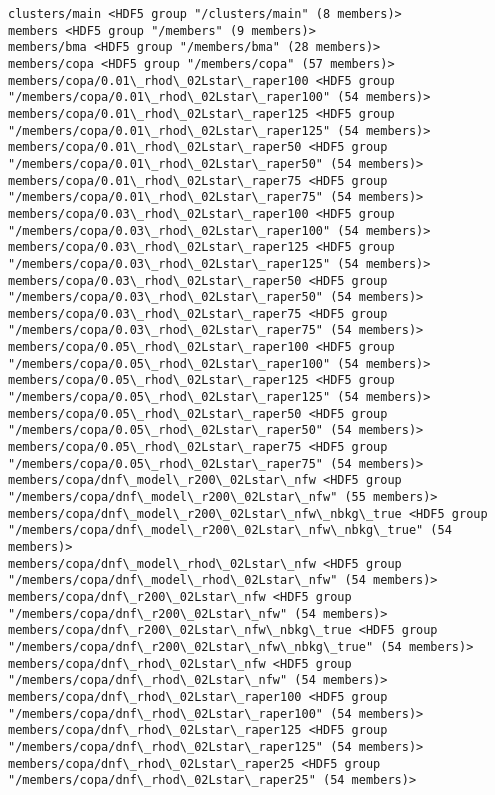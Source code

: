 \documentclass[11pt]{article}
\begin{document}
\begin{Verbatim}[commandchars=\\\{\}]
clusters/main <HDF5 group "/clusters/main" (8 members)>
members <HDF5 group "/members" (9 members)>
members/bma <HDF5 group "/members/bma" (28 members)>
members/copa <HDF5 group "/members/copa" (57 members)>
members/copa/0.01\_rhod\_02Lstar\_raper100 <HDF5 group "/members/copa/0.01\_rhod\_02Lstar\_raper100" (54 members)>
members/copa/0.01\_rhod\_02Lstar\_raper125 <HDF5 group "/members/copa/0.01\_rhod\_02Lstar\_raper125" (54 members)>
members/copa/0.01\_rhod\_02Lstar\_raper50 <HDF5 group "/members/copa/0.01\_rhod\_02Lstar\_raper50" (54 members)>
members/copa/0.01\_rhod\_02Lstar\_raper75 <HDF5 group "/members/copa/0.01\_rhod\_02Lstar\_raper75" (54 members)>
members/copa/0.03\_rhod\_02Lstar\_raper100 <HDF5 group "/members/copa/0.03\_rhod\_02Lstar\_raper100" (54 members)>
members/copa/0.03\_rhod\_02Lstar\_raper125 <HDF5 group "/members/copa/0.03\_rhod\_02Lstar\_raper125" (54 members)>
members/copa/0.03\_rhod\_02Lstar\_raper50 <HDF5 group "/members/copa/0.03\_rhod\_02Lstar\_raper50" (54 members)>
members/copa/0.03\_rhod\_02Lstar\_raper75 <HDF5 group "/members/copa/0.03\_rhod\_02Lstar\_raper75" (54 members)>
members/copa/0.05\_rhod\_02Lstar\_raper100 <HDF5 group "/members/copa/0.05\_rhod\_02Lstar\_raper100" (54 members)>
members/copa/0.05\_rhod\_02Lstar\_raper125 <HDF5 group "/members/copa/0.05\_rhod\_02Lstar\_raper125" (54 members)>
members/copa/0.05\_rhod\_02Lstar\_raper50 <HDF5 group "/members/copa/0.05\_rhod\_02Lstar\_raper50" (54 members)>
members/copa/0.05\_rhod\_02Lstar\_raper75 <HDF5 group "/members/copa/0.05\_rhod\_02Lstar\_raper75" (54 members)>
members/copa/dnf\_model\_r200\_02Lstar\_nfw <HDF5 group "/members/copa/dnf\_model\_r200\_02Lstar\_nfw" (55 members)>
members/copa/dnf\_model\_r200\_02Lstar\_nfw\_nbkg\_true <HDF5 group "/members/copa/dnf\_model\_r200\_02Lstar\_nfw\_nbkg\_true" (54 members)>
members/copa/dnf\_model\_rhod\_02Lstar\_nfw <HDF5 group "/members/copa/dnf\_model\_rhod\_02Lstar\_nfw" (54 members)>
members/copa/dnf\_r200\_02Lstar\_nfw <HDF5 group "/members/copa/dnf\_r200\_02Lstar\_nfw" (54 members)>
members/copa/dnf\_r200\_02Lstar\_nfw\_nbkg\_true <HDF5 group "/members/copa/dnf\_r200\_02Lstar\_nfw\_nbkg\_true" (54 members)>
members/copa/dnf\_rhod\_02Lstar\_nfw <HDF5 group "/members/copa/dnf\_rhod\_02Lstar\_nfw" (54 members)>
members/copa/dnf\_rhod\_02Lstar\_raper100 <HDF5 group "/members/copa/dnf\_rhod\_02Lstar\_raper100" (54 members)>
members/copa/dnf\_rhod\_02Lstar\_raper125 <HDF5 group "/members/copa/dnf\_rhod\_02Lstar\_raper125" (54 members)>
members/copa/dnf\_rhod\_02Lstar\_raper25 <HDF5 group "/members/copa/dnf\_rhod\_02Lstar\_raper25" (54 members)>

\end{Verbatim}
\end{document}
